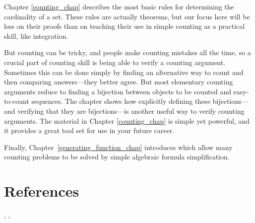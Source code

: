 \iffalse
In Chapter~\ref{chap:recurrences}, we show how to solve a variety of
recurrences that arise in computational problems.  These methods are
especially useful when you need to design or analyze recursive
programs.
\fi

Chapter \ref{counting_chap} describes the most basic rules for determining
the cardinality of a set.  These rules are actually theorems, but our
focus here will be less on their proofs than on teaching their use in
simple counting as a practical skill, like integration.

But counting can be tricky, and people make counting mistakes all the
time, so a crucial part of counting skill is being able to verify a
counting argument.  Sometimes this can be done simply by finding an
alternative way to count and then comparing answers---they better
agree.  But most elementary counting arguments reduce to finding a
bijection between objects to be counted and easy-to-count sequences.
The chapter shows how explicitly defining these bijections---and
verifying that they are bijections---is another useful way to verify
counting arguments.  The material in Chapter \ref{counting_chap} is
simple yet powerful, and it provides a great tool set for use in your
future career.

Finally, Chapter~\ref{generating_function_chap} introduces
 which allow many counting problems to be
solved by simple algebraic formula simplification.

\iffalse
We conclude in Chapter~\ref{cardinality_chap} with a brief digression
into the final frontier of counting---infinity.  We'll define what it
means for a set to be countable and show you some examples of sets
that are really big---bigger even than the set of real numbers.
\fi

\section{References}
 \cite{BenjaminQ2003},
 \cite{GrahamKP1994},
 \cite{MR2359513}   %

\endinput
